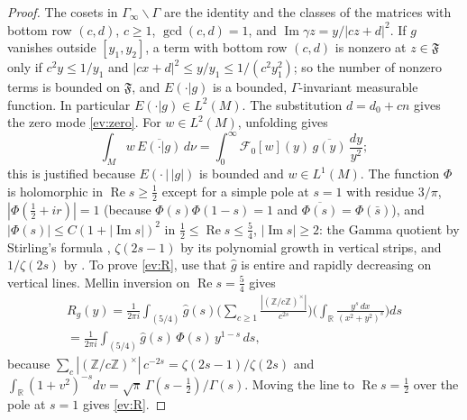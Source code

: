 \begin{proof} The
cosets in $\Gamma_\infty\backslash\Gamma$ are the identity and the classes of the matrices with bottom row $(c,d)$, $c\ge1$, $\gcd(c,d)=1$, and
$\operatorname{Im}\gamma z=y/|cz+d|^2$. If $g$ vanishes outside $[y_1,y_2]$, a term with bottom row $(c,d)$ is nonzero at $z\in\mathfrak F$ only if
$c^2y\le1/y_1$ and $|cx+d|^2\le y/y_1\le1/(c^2y_1^2)$; so the number of nonzero terms is bounded on $\mathfrak F$, and $E(\cdot|g)$ is a bounded, $\Gamma$-invariant
measurable function. In particular $E(\cdot|g)\in L^2(M)$. The substitution $d=d_0+cn$ gives
the zero mode \eqref{ev:zero}. For $w\in L^2(M)$, unfolding gives
\begin{equation}\label{ev:unf}
  \int_Mw\,\overline{E(\cdot|g)}\,d\nu=\int_0^\infty \mathcal F_0[w](y)\,\overline{g(y)}\,\frac{dy}{y^2};
\end{equation}
this is justified because $E(\cdot\,|\,|g|)$ is bounded and $w\in L^1(M)$. The function $\Phi$ is holomorphic in $\operatorname{Re}s\ge\tfrac12$ except for a simple
pole at $s=1$ with residue $3/\pi$, $|\Phi(\tfrac12+ir)|=1$ (because $\Phi(s)\Phi(1-s)=1$ and $\overline{\Phi(s)}=\Phi(\bar s)$), and
$|\Phi(s)|\le C(1+|\operatorname{Im}s|)^2$ in $\tfrac12\le\operatorname{Re}s\le\tfrac54$, $|\operatorname{Im}s|\ge2$: the Gamma quotient by Stirling's formula \cite[5.11.9]{DLMF},
$\zeta(2s-1)$ by its polynomial growth in vertical strips, and $1/\zeta(2s)$ by \cite[Theorem~6.7]{MV07}.
To prove \eqref{ev:R}, use that $\hat g$ is entire and rapidly decreasing on vertical lines. Mellin inversion on $\operatorname{Re}s=\tfrac54$ gives
\begin{multline*}
  R_g(y)=\frac1{2\pi i}\int_{(5/4)}\hat g(s)\Big(\sum_{c\ge1}\frac{|(\mathbb Z/c\mathbb Z)^\times|}{c^{2s}}\Big)\Big(\int_{\mathbb R}\frac{y^s\,dx}{(x^2+y^2)^s}\Big)ds\\
  =\frac1{2\pi i}\int_{(5/4)}\hat g(s)\,\Phi(s)\,y^{1-s}\,ds ,
\end{multline*}
because $\sum_c|(\mathbb Z/c\mathbb Z)^\times|\,c^{-2s}=\zeta(2s-1)/\zeta(2s)$ and $\int_{\mathbb R}(1+v^2)^{-s}dv=\sqrt\pi\,\Gamma(s-\tfrac12)/\Gamma(s)$. Moving the line to
$\operatorname{Re}s=\tfrac12$ over the pole at $s=1$ gives \eqref{ev:R}.


\end{proof}

